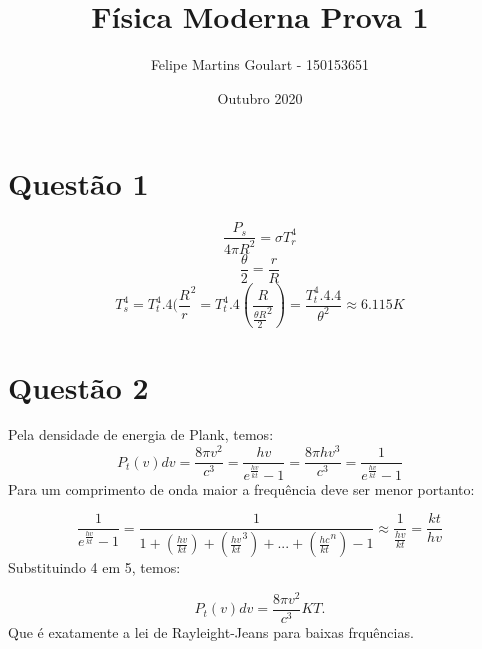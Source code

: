 \documentclass{article}
\title{Física Moderna Prova 1}
\author{Felipe Martins Goulart - 150153651}
\date{Outubro 2020}
\begin{document}
\maketitle

\section {Questão 1}
\begin{equation}
    { \frac{P_s}{4 \pi R^2} = \sigma T_r^4}
\end{equation}
\begin{equation}
    { \frac{\theta}{2} = \frac{r}{R}}
\end{equation}
\begin{equation}
    {T_s^4 = T_t^4 . 4(\frac{R}{r}^2 =T_t^4 . 4(\frac{R}{\frac{\theta{R}}{2}^2}) = \frac{T_t^4 .4.4}{\theta^2} \approx 6.115 K}
\end{equation}
\section {Questão 2}
Pela densidade de energia de Plank, temos:
\begin{equation}
    { P_t(v)dv = \frac{8 \pi v^2}{c^3} = \frac{hv}{e^{\frac{hv}{kt}} - 1} =  \frac{8 \pi hv^3}{c^3} = \frac{1}{e^{\frac{hv}{kt}} - 1}}
\end{equation}
Para um comprimento de onda maior a frequência deve ser menor portanto:

\begin{equation}
    { \frac{1}{e^{\frac{hv}{kt}} - 1} = \frac{1}{ 1 + (\frac{hv}{kt})+(\frac{hv}{kt}^3) + ... + (\frac{hc}{kt}^n) - 1} \approx \frac{1}{\frac{hv}{kt}} = \frac{kt}{hv}}  
\end{equation}
Substituindo 4 em 5, temos:

\begin{equation}
    {P_t(v)dv = \frac{8 \pi v^2}{c^3}KT} .
\end{equation}
Que é exatamente a lei de Rayleight-Jeans para baixas frquências.
\end{document}
